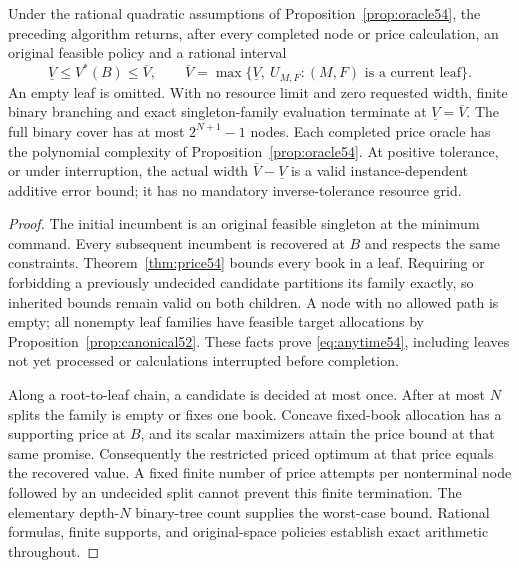 \begin{theorem}\label{thm:branch54}
Under the rational quadratic assumptions of Proposition~\ref{prop:oracle54}, the preceding algorithm returns, after every completed node or price calculation, an original feasible policy and a rational interval
\begin{equation}\label{eq:anytime54}
 \underline V\leq V^*(B)\leq\overline V,
 \qquad
 \overline V=\max\{\underline V,\ U_{M,F}: (M,F)\text{ is a current leaf}\}.
\end{equation}
An empty leaf is omitted. With no resource limit and zero requested width, finite binary branching and exact singleton-family evaluation terminate at $\underline V=\overline V$. The full binary cover has at most $2^{N+1}-1$ nodes. Each completed price oracle has the polynomial complexity of Proposition~\ref{prop:oracle54}. At positive tolerance, or under interruption, the actual width $\overline V-\underline V$ is a valid instance-dependent additive error bound; it has no mandatory inverse-tolerance resource grid.
\end{theorem}
\begin{proof}
The initial incumbent is an original feasible singleton at the minimum command. Every subsequent incumbent is recovered at $B$ and respects the same constraints. Theorem~\ref{thm:price54} bounds every book in a leaf. Requiring or forbidding a previously undecided candidate partitions its family exactly, so inherited bounds remain valid on both children. A node with no allowed path is empty; all nonempty leaf families have feasible target allocations by Proposition~\ref{prop:canonical52}. These facts prove \eqref{eq:anytime54}, including leaves not yet processed or calculations interrupted before completion.

Along a root-to-leaf chain, a candidate is decided at most once. After at most $N$ splits the family is empty or fixes one book. Concave fixed-book allocation has a supporting price at $B$, and its scalar maximizers attain the price bound at that same promise. Consequently the restricted priced optimum at that price equals the recovered value. A fixed finite number of price attempts per nonterminal node followed by an undecided split cannot prevent this finite termination. The elementary depth-$N$ binary-tree count supplies the worst-case bound. Rational formulas, finite supports, and original-space policies establish exact arithmetic throughout.
\end{proof}

